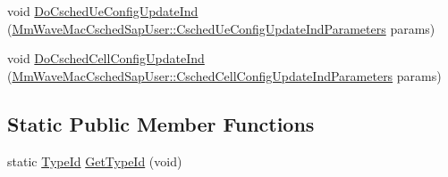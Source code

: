 \begin{DoxyCompactItemize}
\item 
void \hyperlink{classns3_1_1MmWaveEnbMac_a562791e2228d91c7f754f0889d503005}{Do\+Csched\+Ue\+Config\+Update\+Ind} (\hyperlink{structns3_1_1MmWaveMacCschedSapUser_1_1CschedUeConfigUpdateIndParameters}{Mm\+Wave\+Mac\+Csched\+Sap\+User\+::\+Csched\+Ue\+Config\+Update\+Ind\+Parameters} params)
\item 
void \hyperlink{classns3_1_1MmWaveEnbMac_ae939e568682a29d232963f3756217bb2}{Do\+Csched\+Cell\+Config\+Update\+Ind} (\hyperlink{structns3_1_1MmWaveMacCschedSapUser_1_1CschedCellConfigUpdateIndParameters}{Mm\+Wave\+Mac\+Csched\+Sap\+User\+::\+Csched\+Cell\+Config\+Update\+Ind\+Parameters} params)
\end{DoxyCompactItemize}
\subsection*{Static Public Member Functions}
\begin{DoxyCompactItemize}
\item 
static \hyperlink{classns3_1_1TypeId}{Type\+Id} \hyperlink{classns3_1_1MmWaveEnbMac_ab086df1e024b272a373c90f47cf1de16}{Get\+Type\+Id} (void)
\end{DoxyCompactItemize}
